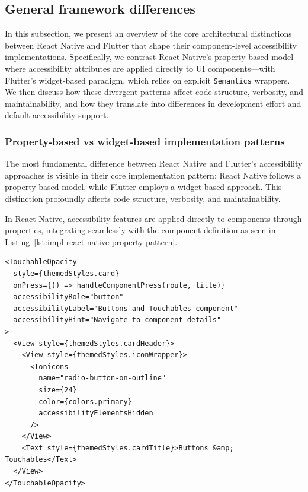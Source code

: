 {\subsection{General framework differences}

In this subsection, we present an overview of the core architectural distinctions between React Native and Flutter that shape their component-level accessibility implementations. Specifically, we contrast React Native’s property-based model—where accessibility attributes are applied directly to UI components—with Flutter’s widget-based paradigm, which relies on explicit \texttt{Semantics} wrappers. We then discuss how these divergent patterns affect code structure, verbosity, and maintainability, and how they translate into differences in development effort and default accessibility support.  

\subsubsection{Property-based vs widget-based implementation patterns}

The most fundamental difference between React Native and Flutter's accessibility approaches is visible in their core implementation pattern: React Native follows a property-based model, while Flutter employs a widget-based approach. This distinction profoundly affects code structure, verbosity, and maintainability.

In React Native, accessibility features are applied directly to components through properties, integrating seamlessly with the component definition as seen in Listing~\ref{lst:impl-react-native-property-pattern}.

\begin{lstlisting}[style=ReactNativeStyle, caption=Property-based accessibility pattern in React Native, label=lst:impl-react-native-property-pattern]
<TouchableOpacity
  style={themedStyles.card}
  onPress={() => handleComponentPress(route, title)}
  accessibilityRole="button"
  accessibilityLabel="Buttons and Touchables component"
  accessibilityHint="Navigate to component details"
>
  <View style={themedStyles.cardHeader}>
    <View style={themedStyles.iconWrapper}>
      <Ionicons
        name="radio-button-on-outline"
        size={24}
        color={colors.primary}
        accessibilityElementsHidden
      />
    </View>
    <Text style={themedStyles.cardTitle}>Buttons &amp; Touchables</Text>
  </View>
</TouchableOpacity>
\end{lstlisting}

}
